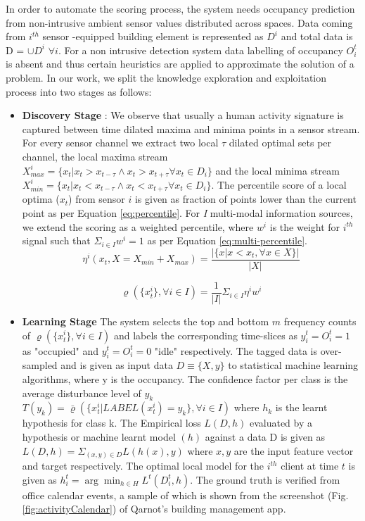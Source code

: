 \documentclass[conference]{IEEEtran}
\begin{document}
In order to automate the scoring process, the system needs occupancy prediction from non-intrusive ambient sensor values distributed across spaces. Data coming from $i^{th}$ sensor -equipped building element is represented as $D^i$ and total data is D = $\cup D^i $ $\forall i$. For a non intrusive detection system data labelling of occupancy $O_i^t$ is absent and thus certain heuristics are applied to approximate the solution of a problem. In our work, we split the knowledge exploration and exploitation process into two stages as follows:
 \begin{itemize}
	 \item \textbf{Discovery Stage }: We observe that usually a human activity signature is captured between time dilated maxima and minima points in a sensor stream. For every sensor channel we extract two local $\tau$ dilated optimal sets per channel, the local maxima stream $X^i_{max} = \{x_t | x_t > x_{t-\tau} \land x_t > x_{t+\tau} \forall x_t \in D_i \} $ and the local minima stream $X^i_{min} = \{x_t | x_t < x_{t-\tau} \land x_t < x_{t+\tau}  \forall x_t \in D_i\} $.  The percentile score of  a local optima ($x_t$) from sensor $i$ is  given as fraction of points lower than the current point as per Equation \ref{eq:percentile}. For \textit{I} multi-modal information sources, we extend the scoring as a weighted percentile, where $w^i$ is the weight for $i^{th}$ signal such that $\Sigma_{i \in I}w^i =1$ as per Equation \ref{eq:multi-percentile}.
	 \begin{equation}
	     \eta^i(x_t,X=X_{min}+X_{max} ) = \frac{|\{x|x<x_t, \forall x \in X\}|}{|X|}
	     \label{eq:percentile}
	 \end{equation}
   
  \begin{equation}
      \varrho(\{x^i_t\}, \forall i \in {I}) = \frac{1}{|I|}\Sigma_{i \in I}  \eta^i w^i
      \label{eq:multi-percentile}
  \end{equation}
   
   \item \textbf{Learning Stage} 
  The system selects the top and bottom $m$ frequency counts of  $\varrho(\{x^i_t\}, \forall i \in {I})$ and labels the corresponding time-slices as $y_i^t= O^t_i=1$ as "occupied" and $y_i^t= O^t_i=0$ "idle" respectively. The tagged data is over-sampled and is given as input data $D \equiv \{X,y\}$ to statistical machine learning algorithms, where y is the occupancy. The confidence factor per class is the average disturbance level of $y_k$ $  T(y_k) =  \bar \varrho(\{x^i_t |LABEL (x^i_t ) =  y_k\}, \forall i \in {I})$ where $h_k$ is the learnt hypothesis for class k. The Empirical loss $L(D,h)$ evaluated by a hypothesis or machine learnt model $(h)$ against a data D is given as $L(D,h) = \Sigma_{(x,y) \in D} L(h(x),y)$ where $x,y$ are the input feature vector and target respectively. The optimal local model for the $i^{th}$ client at time $t$ is given as $h_i^t = \arg \min_{h \in H} L^t(D^t_i, h)$. The ground truth is verified from office calendar events, a sample of which is shown from the screenshot (Fig. \ref{fig:activityCalendar}) of Qarnot's building management app. 
  

\end{itemize}
\end{document}
